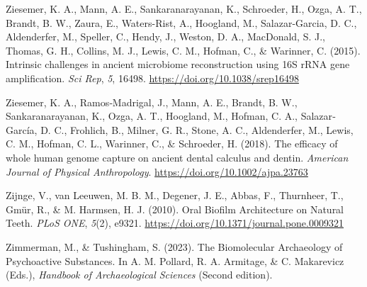\documentclass[
  letterpaper,
]{book}
\newlength{\cslhangindent}
\newlength{\cslentryspacingunit} %
\newenvironment{CSLReferences}[2] %
 {%
  \setlength{\parindent}{0pt}
  \ifodd #1
  \let\oldpar\par
  \def\par{\hangindent=\cslhangindent\oldpar}
  \fi
  \setlength{\parskip}{#2\cslentryspacingunit}
 }%
 {}
\begin{document}
\begin{CSLReferences}{1}{0}
\leavevmode{}%
Ziesemer, K. A., Mann, A. E., Sankaranarayanan, K., Schroeder, H., Ozga,
A. T., Brandt, B. W., Zaura, E., Waters-Rist, A., Hoogland, M.,
Salazar-Garcia, D. C., Aldenderfer, M., Speller, C., Hendy, J., Weston,
D. A., MacDonald, S. J., Thomas, G. H., Collins, M. J., Lewis, C. M.,
Hofman, C., \& Warinner, C. (2015). Intrinsic challenges in ancient
microbiome reconstruction using {16S rRNA} gene amplification. \emph{Sci
Rep}, \emph{5}, 16498. \url{https://doi.org/10.1038/srep16498}

\leavevmode{}%
Ziesemer, K. A., Ramos‐Madrigal, J., Mann, A. E., Brandt, B. W.,
Sankaranarayanan, K., Ozga, A. T., Hoogland, M., Hofman, C. A.,
Salazar‐García, D. C., Frohlich, B., Milner, G. R., Stone, A. C.,
Aldenderfer, M., Lewis, C. M., Hofman, C. L., Warinner, C., \&
Schroeder, H. (2018). The efficacy of whole human genome capture on
ancient dental calculus and dentin. \emph{American Journal of Physical
Anthropology}. \url{https://doi.org/10.1002/ajpa.23763}

\leavevmode{}%
Zijnge, V., van Leeuwen, M. B. M., Degener, J. E., Abbas, F., Thurnheer,
T., Gmür, R., \& M. Harmsen, H. J. (2010). Oral {Biofilm Architecture}
on {Natural Teeth}. \emph{PLoS ONE}, \emph{5}(2), e9321.
\url{https://doi.org/10.1371/journal.pone.0009321}

\leavevmode{}%
Zimmerman, M., \& Tushingham, S. (2023). The {Biomolecular Archaeology}
of {Psychoactive Substances}. In A. M. Pollard, R. A. Armitage, \& C.
Makarevicz (Eds.), \emph{Handbook of {Archaeological Sciences}} (Second
edition).

\end{CSLReferences}

\backmatter
\end{document}
